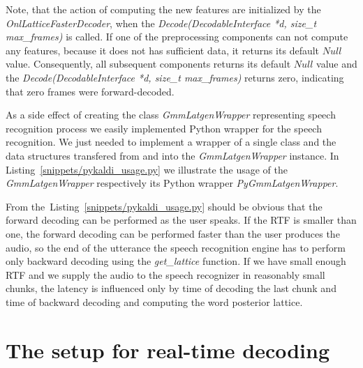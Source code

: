 Note, that the action of computing the new features are initialized by the {\it OnlLatticeFasterDecoder},
when the {\it Decode(DecodableInterface *d, size\_t max\_frames)}\/ is called.
If one of the preprocessing components can not compute any features, 
because it does not has sufficient data, it returns its default $Null$ value. 
Consequently, all subsequent components returns its default $Null$ value and 
the {\it Decode(DecodableInterface *d, size\_t max\_frames)}\/ returns zero,
indicating that zero frames were forward-decoded.

As a side effect of creating the class {\it GmmLatgenWrapper}\/ representing speech recognition process
we easily implemented Python wrapper for the speech recognition. 
We just needed to implement a wrapper of a single class and the data structures transfered from and into the
{\it GmmLatgenWrapper}\/ instance.
In Listing~\ref{snippets/pykaldi_usage.py} we illustrate the usage of the {\it GmmLatgenWrapper}\/
respectively its Python wrapper {\it PyGmmLatgenWrapper}.


From the~Listing~\ref{snippets/pykaldi_usage.py} should be obvious that 
the forward decoding can be performed as the user speaks.
If the \ac{RTF} is smaller than one, the forward decoding can be performed faster
than the user produces the audio, so the end of the utterance
the speech recognition engine has to perform only backward decoding using 
the {\it get\_lattice}\/ function.
If we have small enough \ac{RTF} and we supply the audio to the speech recognizer
in reasonably small chunks, the latency is influenced only by time of decoding the last chunk
and time of backward decoding and computing the word posterior lattice.

\section{The setup for real-time decoding}





